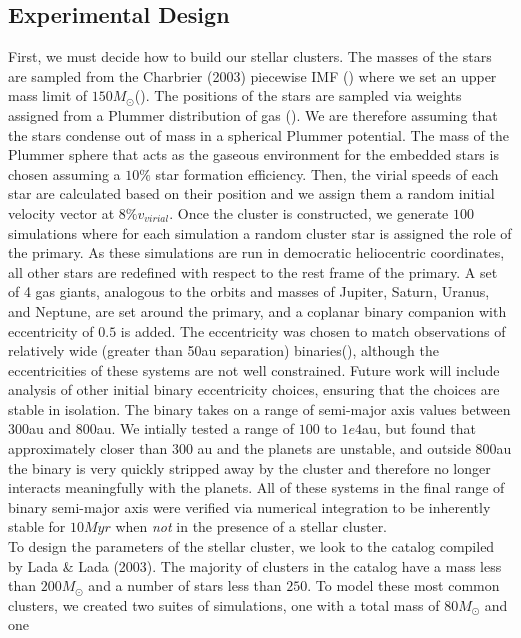 \documentclass[manuscript]{aastex631}
\begin{document}
\subsection{Experimental Design}
First, we must decide how to build our stellar clusters. The masses of the stars are sampled from the Charbrier (2003) piecewise IMF (\cite{cha03}) where we set
an upper mass limit of $150 M_{\odot}$(\cite{wei04}).
The positions of the stars are sampled via weights assigned from a Plummer distribution of gas (\cite{plu11}). We are therefore assuming that the stars
condense out of mass in a spherical Plummer potential. The mass of the Plummer sphere that acts as the gaseous environment for the
embedded stars is chosen assuming a $10\%$ star formation efficiency. Then, the virial speeds of each star are calculated based on their position
and we assign them a random initial velocity vector at $8\% v_{virial}$\cite{lev10}. Once the cluster is constructed, we generate $100$ simulations
where for each simulation a random cluster star is assigned the role of the primary. As these simulations are run in democratic heliocentric
coordinates, all other stars are redefined with respect to the rest frame of the primary. A set of 4 gas giants, analogous to the orbits and 
masses of Jupiter, Saturn, Uranus, and Neptune, are set around the primary, and a coplanar binary companion with eccentricity of 
$0.5$ is added. The eccentricity was chosen to match observations of relatively wide (greater
than 50au separation) binaries(\cite{tok16}), although the eccentricities of these systems are not well constrained. Future work will include
analysis of other initial binary eccentricity choices, ensuring that the choices are stable in isolation.
The binary takes on a range of semi-major axis values between $300$au and $800$au. We intially tested
a range of $100$ to $1e4$au, but found that approximately closer than $300$ au and the planets are unstable, and outside $800$au 
the binary is very quickly stripped away by the cluster and therefore no longer interacts meaningfully with the planets. 
 All of these systems in the final range of binary semi-major axis were verified via numerical integration to be inherently stable for $10 Myr$ when \textit{not} 
 in the presence of a stellar cluster. \\
\indent To design the parameters of the stellar cluster, we look to the catalog compiled by Lada \& Lada (2003)\cite{lad03}. The majority of clusters in the catalog have a mass less than
$200M_{\odot}$ and a number of stars less than $250$. To model these most common clusters, we created two suites of simulations, one with a total mass of $80M_{\odot}$ and one
\end{document}
